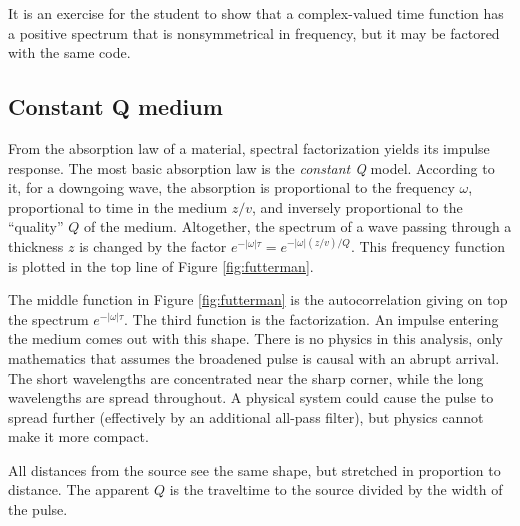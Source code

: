 \par
It is an exercise for the student to show that
a complex-valued time function has
a positive spectrum that is nonsymmetrical in frequency,
but it may be factored with the same code.

\subsection{Constant Q medium}
From the absorption law of a material, spectral factorization yields its impulse response.
The most basic absorption law is the {\em constant Q} model.
According to it, for a downgoing wave,
the absorption is proportional to the frequency $\omega$,
proportional to time in the medium $z/v$,
and inversely proportional to the ``quality'' $Q$ of the medium.
Altogether, the spectrum of a wave passing through a thickness $z$ is changed by the factor
$ e^{-|\omega|\tau} = e^{-|\omega|(z/v)/Q} $.
This frequency function is plotted in the top line of Figure \ref{fig:futterman}.

\par

The middle function in Figure \ref{fig:futterman}
is the autocorrelation giving on top
the spectrum
$e^{-|\omega|\tau}$.
The third function is the factorization.
An impulse entering the medium comes out with this shape.
There is no physics in this analysis,
only mathematics that assumes the broadened pulse
is causal with an abrupt arrival.
The short wavelengths are concentrated near the sharp corner,
while the long wavelengths are spread throughout.
A physical system could cause the pulse to spread further
(effectively by an additional all-pass filter),
but physics cannot make it more compact.
\par
All distances from the source see the same shape, but stretched
in proportion to distance.
The apparent $Q$ is
the traveltime to the source divided by the width of the pulse.


